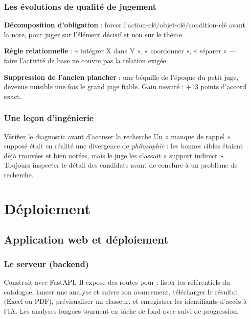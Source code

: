 \documentclass[11pt,a4paper]{report}
\begin{document}
\section{Les évolutions de qualité de jugement}
\begin{motiv}
\textbf{Décomposition d'obligation} : forcer l'action-clé/objet-clé/condition-clé avant la note, pour juger sur l'élément décisif et non sur le thème.
\end{motiv}
\begin{motiv}
\textbf{Règle relationnelle} : « intégrer X dans Y », « coordonner », « séparer » --- faire l'activité de base ne couvre pas la relation exigée.
\end{motiv}
\begin{motiv}
\textbf{Suppression de l'ancien plancher} : une béquille de l'époque du petit juge, devenue nuisible une fois le grand juge fiable. Gain mesuré : +13 points d'accord exact.
\end{motiv}

\section{Une leçon d'ingénierie}
\begin{keybox}{Vérifier le diagnostic avant d'accuser la recherche}
Un « manque de rappel » supposé était en réalité une divergence de \emph{philosophie} : les bonnes cibles étaient déjà trouvées et bien notées, mais le juge les classait « support indirect ». Toujours inspecter le détail des candidats avant de conclure à un problème de recherche.
\end{keybox}

\part{Déploiement}

\chapter{Application web et déploiement}

\section{Le serveur (backend)}
Construit avec FastAPI. Il expose des routes pour : lister les référentiels du catalogue, lancer une analyse et suivre son avancement, télécharger le résultat (Excel ou PDF), prévisualiser un classeur, et enregistrer les identifiants d'accès à l'IA. Les analyses longues tournent en tâche de fond avec suivi de progression.
\end{document}
